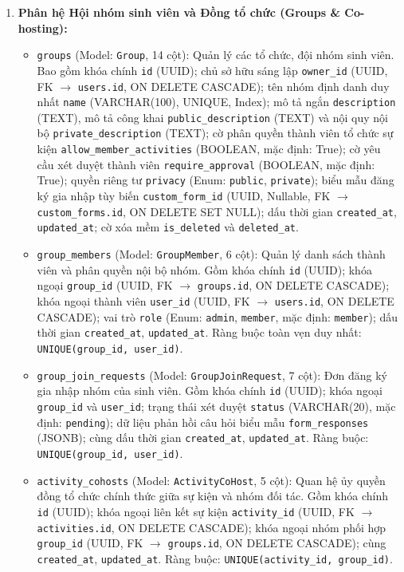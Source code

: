 \begin{enumerate}
    \item \textbf{Phân hệ Hội nhóm sinh viên và Đồng tổ chức (Groups \& Co-hosting):}
    \begin{itemize}
        \item \texttt{groups} (Model: \texttt{Group}, 14 cột): Quản lý các tổ chức, đội nhóm sinh viên. Bao gồm khóa chính \texttt{id} (UUID); chủ sở hữu sáng lập \texttt{owner\_id} (UUID, FK $\rightarrow$ \texttt{users.id}, ON DELETE CASCADE); tên nhóm định danh duy nhất \texttt{name} (VARCHAR(100), UNIQUE, Index); mô tả ngắn \texttt{description} (TEXT), mô tả công khai \texttt{public\_description} (TEXT) và nội quy nội bộ \texttt{private\_description} (TEXT); cờ phân quyền thành viên tổ chức sự kiện \texttt{allow\_member\_activities} (BOOLEAN, mặc định: True); cờ yêu cầu xét duyệt thành viên \texttt{require\_approval} (BOOLEAN, mặc định: True); quyền riêng tư \texttt{privacy} (Enum: \texttt{public}, \texttt{private}); biểu mẫu đăng ký gia nhập tùy biến \texttt{custom\_form\_id} (UUID, Nullable, FK $\rightarrow$ \texttt{custom\_forms.id}, ON DELETE SET NULL); dấu thời gian \texttt{created\_at}, \texttt{updated\_at}; cờ xóa mềm \texttt{is\_deleted} và \texttt{deleted\_at}.
        \item \texttt{group\_members} (Model: \texttt{GroupMember}, 6 cột): Quản lý danh sách thành viên và phân quyền nội bộ nhóm. Gồm khóa chính \texttt{id} (UUID); khóa ngoại \texttt{group\_id} (UUID, FK $\rightarrow$ \texttt{groups.id}, ON DELETE CASCADE); khóa ngoại thành viên \texttt{user\_id} (UUID, FK $\rightarrow$ \texttt{users.id}, ON DELETE CASCADE); vai trò \texttt{role} (Enum: \texttt{admin}, \texttt{member}, mặc định: \texttt{member}); dấu thời gian \texttt{created\_at}, \texttt{updated\_at}. Ràng buộc toàn vẹn duy nhất: \texttt{UNIQUE(group\_id, user\_id)}.
        \item \texttt{group\_join\_requests} (Model: \texttt{GroupJoinRequest}, 7 cột): Đơn đăng ký gia nhập nhóm của sinh viên. Gồm khóa chính \texttt{id} (UUID); khóa ngoại \texttt{group\_id} và \texttt{user\_id}; trạng thái xét duyệt \texttt{status} (VARCHAR(20), mặc định: \texttt{pending}); dữ liệu phản hồi câu hỏi biểu mẫu \texttt{form\_responses} (JSONB); cùng dấu thời gian \texttt{created\_at}, \texttt{updated\_at}. Ràng buộc: \texttt{UNIQUE(group\_id, user\_id)}.
        \item \texttt{activity\_cohosts} (Model: \texttt{ActivityCoHost}, 5 cột): Quan hệ ủy quyền đồng tổ chức chính thức giữa sự kiện và nhóm đối tác. Gồm khóa chính \texttt{id} (UUID); khóa ngoại liên kết sự kiện \texttt{activity\_id} (UUID, FK $\rightarrow$ \texttt{activities.id}, ON DELETE CASCADE); khóa ngoại nhóm phối hợp \texttt{group\_id} (UUID, FK $\rightarrow$ \texttt{groups.id}, ON DELETE CASCADE); cùng \texttt{created\_at}, \texttt{updated\_at}. Ràng buộc: \texttt{UNIQUE(activity\_id, group\_id)}.

\end{itemize}
\end{enumerate}
